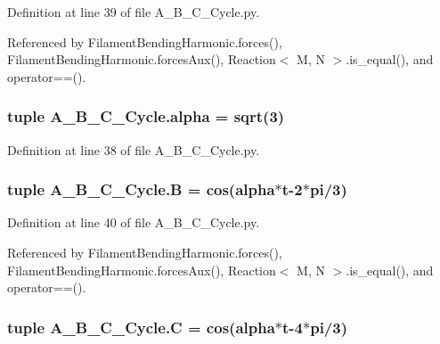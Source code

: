 Definition at line 39 of file A\+\_\+\+B\+\_\+\+C\+\_\+\+Cycle.\+py.



Referenced by Filament\+Bending\+Harmonic.\+forces(), Filament\+Bending\+Harmonic.\+forces\+Aux(), Reaction$<$ M, N $>$.\+is\+\_\+equal(), and operator==().

\hypertarget{namespaceA__B__C__Cycle_a11169d0a2c42df806b8825edefea9f4d}{
\subsubsection[{alpha}]{\setlength{\rightskip}{0pt plus 5cm}tuple A\+\_\+\+B\+\_\+\+C\+\_\+\+Cycle.\+alpha = sqrt(3)}}\label{namespaceA__B__C__Cycle_a11169d0a2c42df806b8825edefea9f4d}


Definition at line 38 of file A\+\_\+\+B\+\_\+\+C\+\_\+\+Cycle.\+py.

\hypertarget{namespaceA__B__C__Cycle_a9771d340c90ea87ee784c884fe2de3dc}{
\subsubsection[{B}]{\setlength{\rightskip}{0pt plus 5cm}tuple A\+\_\+\+B\+\_\+\+C\+\_\+\+Cycle.\+B = cos({\bf alpha}$\ast${\bf t}-\/2$\ast$pi/3)}}\label{namespaceA__B__C__Cycle_a9771d340c90ea87ee784c884fe2de3dc}


Definition at line 40 of file A\+\_\+\+B\+\_\+\+C\+\_\+\+Cycle.\+py.



Referenced by Filament\+Bending\+Harmonic.\+forces(), Filament\+Bending\+Harmonic.\+forces\+Aux(), Reaction$<$ M, N $>$.\+is\+\_\+equal(), and operator==().

\hypertarget{namespaceA__B__C__Cycle_a6b1467f9bbedb7a62110239efb9e068b}{
\subsubsection[{C}]{\setlength{\rightskip}{0pt plus 5cm}tuple A\+\_\+\+B\+\_\+\+C\+\_\+\+Cycle.\+C = cos({\bf alpha}$\ast${\bf t}-\/4$\ast$pi/3)}}\label{namespaceA__B__C__Cycle_a6b1467f9bbedb7a62110239efb9e068b}


